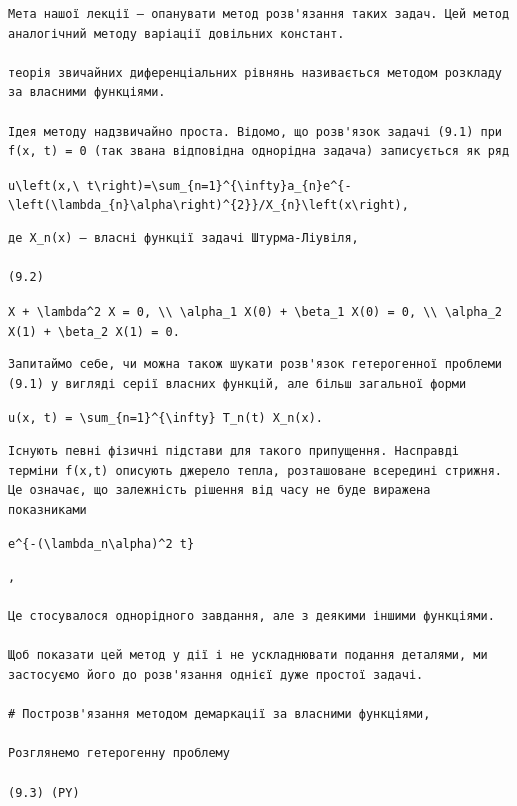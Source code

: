 \documentclass[
  ukrainian,
]{article}
\begin{document}
\begin{verbatim}
Мета нашої лекції — опанувати метод розв'язання таких задач. Цей метод аналогічний методу варіації довільних констант.

теорія звичайних диференціальних рівнянь називається методом розкладу за власними функціями.

Ідея методу надзвичайно проста. Відомо, що розв'язок задачі (9.1) при f(x, t) = 0 (так звана відповідна однорідна задача) записується як ряд
\end{verbatim}

\texttt{u\textbackslash{}left(x,\textbackslash{}\ t\textbackslash{}right)=\textbackslash{}sum\_\{n=1\}\^{}\{\textbackslash{}infty\}a\_\{n\}e\^{}\{-\textbackslash{}left(\textbackslash{}lambda\_\{n\}\textbackslash{}alpha\textbackslash{}right)\^{}\{2\}\}/X\_\{n\}\textbackslash{}left(x\textbackslash{}right),}

\begin{verbatim}
де X_n(x) — власні функції задачі Штурма-Ліувіля,

(9.2)
\end{verbatim}

\texttt{X\textquotesingle{}\textquotesingle{}\ +\ \textbackslash{}lambda\^{}2\ X\ =\ 0,\ \textbackslash{}\textbackslash{}\ \textbackslash{}alpha\_1\ X\textquotesingle{}(0)\ +\ \textbackslash{}beta\_1\ X(0)\ =\ 0,\ \textbackslash{}\textbackslash{}\ \textbackslash{}alpha\_2\ X\textquotesingle{}(1)\ +\ \textbackslash{}beta\_2\ X(1)\ =\ 0.}

\begin{verbatim}
Запитаймо себе, чи можна також шукати розв'язок гетерогенної проблеми (9.1) у вигляді серії власних функцій, але більш загальної форми
\end{verbatim}

\texttt{u(x,\ t)\ =\ \textbackslash{}sum\_\{n=1\}\^{}\{\textbackslash{}infty\}\ T\_n(t)\ X\_n(x).}

\begin{verbatim}
Існують певні фізичні підстави для такого припущення. Насправді терміни f(x,t) описують джерело тепла, розташоване всередині стрижня. Це означає, що залежність рішення від часу не буде виражена показниками
\end{verbatim}

\texttt{e\^{}\{-(\textbackslash{}lambda\_n\textbackslash{}alpha)\^{}2\ t\}}

\begin{verbatim}
,

Це стосувалося однорідного завдання, але з деякими іншими функціями.

Щоб показати цей метод у дії і не ускладнювати подання деталями, ми застосуємо його до розв'язання однієї дуже простої задачі.

# Построзв'язання методом демаркації за власними функціями,

Розглянемо гетерогенну проблему

(9.3) (PY)
\end{verbatim}
\end{document}

